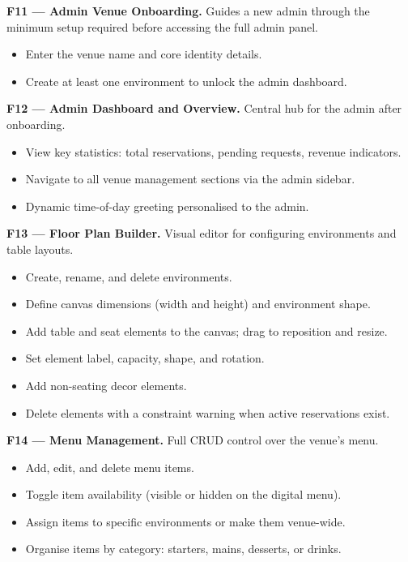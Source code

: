 \documentclass[12pt,a4paper]{article}
\begin{document}
\textbf{F11 --- Admin Venue Onboarding.}
Guides a new admin through the minimum setup required before accessing
the full admin panel.
\begin{itemize}[leftmargin=1.5em, topsep=2pt, itemsep=1pt]
    \item Enter the venue name and core identity details.
    \item Create at least one environment to unlock the admin dashboard.
\end{itemize}

\textbf{F12 --- Admin Dashboard and Overview.}
Central hub for the admin after onboarding.
\begin{itemize}[leftmargin=1.5em, topsep=2pt, itemsep=1pt]
    \item View key statistics: total reservations, pending requests, revenue
          indicators.
    \item Navigate to all venue management sections via the admin sidebar.
    \item Dynamic time-of-day greeting personalised to the admin.
\end{itemize}

\textbf{F13 --- Floor Plan Builder.}
Visual editor for configuring environments and table layouts.
\begin{itemize}[leftmargin=1.5em, topsep=2pt, itemsep=1pt]
    \item Create, rename, and delete environments.
    \item Define canvas dimensions (width and height) and environment shape.
    \item Add table and seat elements to the canvas; drag to reposition and
          resize.
    \item Set element label, capacity, shape, and rotation.
    \item Add non-seating decor elements.
    \item Delete elements with a constraint warning when active reservations
          exist.
\end{itemize}

\textbf{F14 --- Menu Management.}
Full CRUD control over the venue's menu.
\begin{itemize}[leftmargin=1.5em, topsep=2pt, itemsep=1pt]
    \item Add, edit, and delete menu items.
    \item Toggle item availability (visible or hidden on the digital menu).
    \item Assign items to specific environments or make them venue-wide.
    \item Organise items by category: starters, mains, desserts, or drinks.
\end{itemize}
\end{document}
